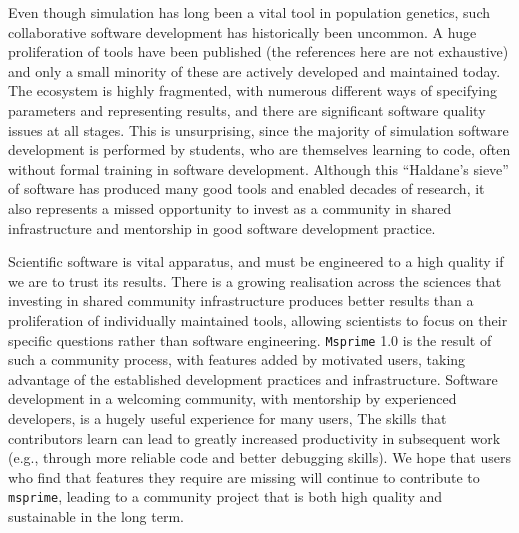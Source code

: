 \documentclass{article}
\newcommand{\msprime}[0]{\texttt{msprime}}
\begin{document}
Even though simulation has long been a vital tool in population genetics,
such collaborative software development has historically been uncommon.
A huge proliferation of tools have been published
(the references here are not exhaustive)
and only a small minority of these are actively developed and
maintained today. The ecosystem is highly fragmented, with numerous different
ways of specifying parameters and representing results, and there are
significant software quality issues at all stages. This is unsurprising, since
the majority of simulation software development is performed by students, who
are themselves learning to code, often without formal training in software
development.
Although this ``Haldane's sieve'' of software has produced many good tools
and enabled decades of research,
it also represents a missed opportunity to invest as a community
in shared infrastructure and mentorship in good software development practice.

Scientific software is vital apparatus, and must be engineered
to a high quality if we are to trust its results. There is a growing
realisation across the sciences \citet[OTHER CITATIONS]{siepel2019challenges}
that investing in
shared community infrastructure produces better results than a
proliferation of individually maintained tools, allowing scientists
to focus on their specific questions rather than software engineering.
\texttt{Msprime} 1.0 is the result of such a community process,
with features added by motivated users, taking advantage of the
established development practices and infrastructure.
Software development in a welcoming community,
with mentorship by experienced developers,
is a hugely useful experience for many users,
The skills that contributors learn
can lead to greatly increased productivity in subsequent
work (e.g., through more reliable code and better debugging skills).
We hope that users who find that
features they require are missing will continue to contribute to
\msprime, leading to a community project that is both high quality
and sustainable in the long term.
\end{document}
